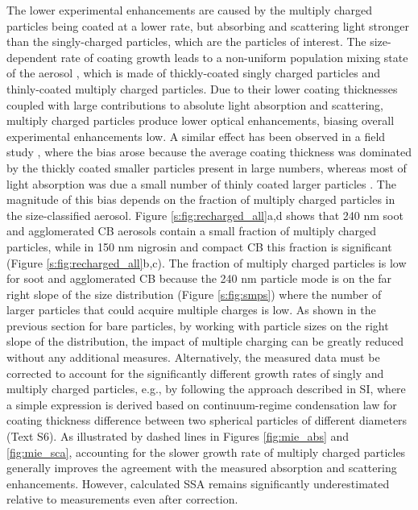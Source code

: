 The lower experimental enhancements are caused by the multiply charged particles being coated at a lower rate, but absorbing and scattering light stronger than the singly-charged particles, which are the particles of interest. The size-dependent rate of coating growth leads to a non-uniform population mixing state of the aerosol \citep{RN75}, which is made of thickly-coated singly charged particles and thinly-coated multiply charged particles. Due to their lower coating thicknesses coupled with large contributions to absolute light absorption and scattering, multiply charged particles produce lower optical enhancements, biasing overall experimental enhancements low. A similar effect has been observed in a field study \citep{RN76}, where the bias arose because the average coating thickness was dominated by the thickly coated smaller particles present in large numbers, whereas most of light absorption was due a small number of thinly coated larger particles \citep{RN52,RN75}. The magnitude of this bias depends on the fraction of multiply charged particles in the size-classified aerosol. Figure \ref{s:fig:recharged_all}a,d shows that 240 nm soot and agglomerated CB aerosols contain a small fraction of multiply charged particles, while in 150 nm nigrosin and compact CB this fraction is significant (Figure \ref{s:fig:recharged_all}b,c). The fraction of multiply charged particles is low for soot and agglomerated CB because the 240 nm particle mode is on the far right slope of the size distribution (Figure \ref{s:fig:smps}) where the number of larger particles that could acquire multiple charges is low. As shown in the previous section for bare particles, by working with particle sizes on the right slope of the distribution, the impact of multiple charging can be greatly reduced without any additional measures. Alternatively, the measured data must be corrected to account for the significantly different growth rates of singly and multiply charged particles, e.g., by following the approach described in SI, where a simple expression is derived based on continuum-regime condensation law for coating thickness difference between two spherical particles of different diameters (Text S6). As illustrated by dashed lines in Figures \ref{fig:mie_abs} and \ref{fig:mie_sca}, accounting for the slower growth rate of multiply charged particles generally improves the agreement with the measured absorption and scattering enhancements. However, calculated SSA remains significantly underestimated relative to measurements even after correction.

